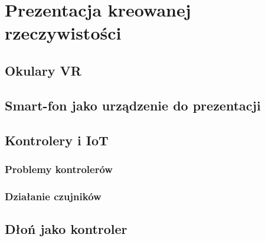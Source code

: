 \chapter{Prezentacja kreowanej rzeczywistości}
\label{ch:prezentacja}

\section{Okulary VR}
\label{sec:okulary}

\section{Smart-fon jako urządzenie do prezentacji}
\label{sec:smartphone}

\section{Kontrolery i IoT}
\label{sec:iot}

	\subsection{Problemy kontrolerów}
	\label{subsec:problemy}
	
	\subsection{Działanie czujników}
	\label{subsec:dzialanie}
\section{Dłoń jako kontroler}
\label{sec:dlon}
